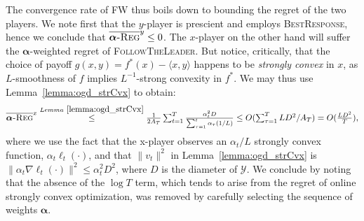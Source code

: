 \documentclass[final,12pt]{colt2018} %
\def\K{\mathcal{K}}
\def\balpha{\boldsymbol{\alpha}}
\def\FTL{\textsc{FollowTheLeader}\xspace}
\def\BR{\textsc{BestResponse}\xspace}
\newcommand{\avgregret}[1]{\overline{\balpha\textsc{-Reg}}^{#1}}
\newcommand{\YY}{\mathcal{Y}}
\begin{document}
The convergence rate of FW thus boils down to bounding the regret of the two players. We note first that the $y$-player is prescient and employs \BR,  hence we conclude that $\avgregret{y} \leq 0$. The $x$-player on the other hand will suffer the $\balpha$-weighted regret of \FTL. But notice, critically, that the choice of payoff $g(x,y) = f^*(x) - \langle x, y \rangle$ happens to be \emph{strongly convex} in $x$, as $L$-smoothness of $f$ implies $L^{-1}$-strong convexity in $f^*$. We may thus use Lemma~\ref{lemma:ogd_strCvx} to obtain:
\[
	\textstyle \avgregret{x} \overset{Lemma~\ref{lemma:ogd_strCvx}}{\leq} \frac 1 {2 A_T} \sum_{t=1}^T \frac{ \alpha_t^2 D }{ \sum_{\tau=1}^t \alpha_{\tau} (1/L)}  \leq  O( \sum_{\tau=1}^T L D^2  /A_T)  = O( \frac{LD^2}{T} ),
 \]
where we use the fact that the x-player observes an $\alpha_{t}/L$ strongly convex function, $\alpha_{t} \ell_{t}(\cdot)$, and that
$\| v_{t}\|^{2}$ in Lemma~\ref{lemma:ogd_strCvx} is $\| \alpha_{t}  \nabla \ell_t(\cdot)\|^{2}\leq \alpha_{t}^{2} D^{2}$, where $D$ is the diameter of $\YY$.
We conclude by noting that the absence of the $\log T$ term, which tends to arise from the regret of online strongly convex optimization, was removed by carefully selecting the sequence of weights $\balpha$.

\end{document}
